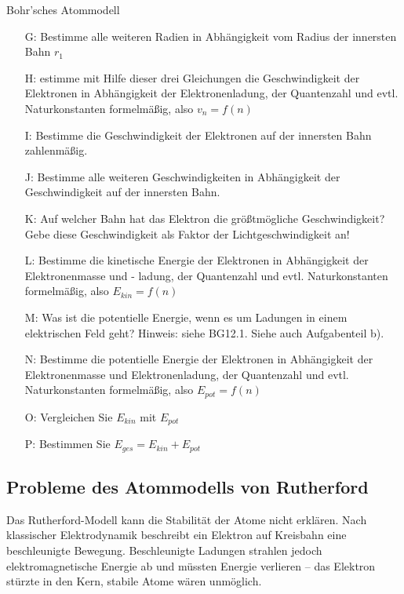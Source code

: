 \documentclass[11pt,a4paper,oneside]{article}
\begin{document}
\begin{aufgabe}{Bohr'sches Atommodell}
\begin{itemize}[left=20mm]
\begin{itemize}[left=-10mm]
				\item [G:] Bestimme alle weiteren Radien in Abhängigkeit vom Radius der innersten Bahn $r_1$
				\item [H:] estimme mit Hilfe dieser drei Gleichungen die Geschwindigkeit der Elektronen in Abhängigkeit der Elektronenladung, der Quantenzahl und evtl. Naturkonstanten formelmäßig, also $v_n = f(n)$
				\item [I:] Bestimme die Geschwindigkeit der Elektronen auf der innersten Bahn zahlenmäßig.
				\item [J:] Bestimme alle weiteren Geschwindigkeiten in Abhängigkeit der Geschwindigkeit auf der innersten Bahn.
			    \item [K:] Auf welcher Bahn hat das Elektron die größtmögliche Geschwindigkeit? Gebe diese Geschwindigkeit als Faktor der Lichtgeschwindigkeit an!
				\item [L:] Bestimme die kinetische Energie der Elektronen in Abhängigkeit der Elektronenmasse und -
				ladung, der Quantenzahl und evtl. Naturkonstanten formelmäßig, also $E_{kin} = f(n)$
				
				\newpage
				
				\item [M:] Was ist die potentielle Energie, wenn es um Ladungen in einem elektrischen Feld geht? Hinweis:
				siehe BG12.1. Siehe auch Aufgabenteil b).
				\item [N:] Bestimme die potentielle Energie der Elektronen in Abhängigkeit der Elektronenmasse und Elektronenladung, der Quantenzahl und evtl. Naturkonstanten formelmäßig, also $E_{pot} = f(n)$
				\item [O:] Vergleichen Sie $E_{kin}$ mit $E_{pot}$
				\item [P:] Bestimmen Sie $E_{ges} = E_{kin} + E_{pot}$ 
			\end{itemize}
		\end{itemize}
	\end{aufgabe}
	
	
	
	\newpage
	
	
	\subsection{Probleme des Atommodells von Rutherford}
	
	Das Rutherford-Modell kann die Stabilität der Atome nicht erklären. 
	Nach klassischer Elektrodynamik beschreibt ein Elektron auf Kreisbahn 
	eine beschleunigte Bewegung. Beschleunigte Ladungen strahlen jedoch 
	elektromagnetische Energie ab und müssten Energie verlieren – 
	das Elektron stürzte in den Kern, stabile Atome wären unmöglich. \\
	
\end{document}
